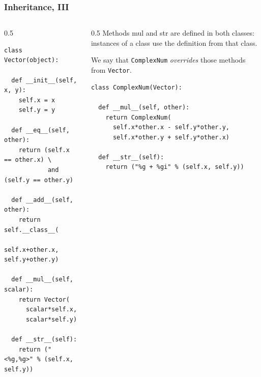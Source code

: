 \begin{frame}[fragile]\frametitle{Inheritance, III}

  \begin{columns}[t]
    \begin{column}{0.5\linewidth}
\begin{lstlisting}[basicstyle=\tiny\ttfamily,showstringspaces=false]
class Vector(object):

  def __init__(self, x, y):
    self.x = x
    self.y = y

  def __eq__(self, other):
    return (self.x == other.x) \
            and (self.y == other.y)

  def __add__(self, other):
    return self.__class__(
      self.x+other.x, self.y+other.y)

  def __mul__(self, scalar):
    return Vector(
      scalar*self.x,
      scalar*self.y)

  def __str__(self):
    return ("<%g,%g>" % (self.x, self.y))
\end{lstlisting}
    \end{column}
    \begin{column}{0.5\linewidth}
      \small
      Methods mul and str are
      defined in both classes: instances of a class use the
      definition from that class.

      We say that \texttt{ComplexNum} \emph{overrides} those
      methods from \texttt{Vector}.
\begin{lstlisting}[basicstyle=\tiny\ttfamily,showstringspaces=false]
class ComplexNum(Vector):

  def __mul__(self, other):
    return ComplexNum(
      self.x*other.x - self.y*other.y,
      self.x*other.y + self.y*other.x)

  def __str__(self):
    return ("%g + %gi" % (self.x, self.y))
\end{lstlisting}
    \end{column}
  \end{columns}
\end{frame}

%
%



